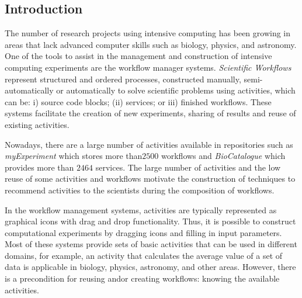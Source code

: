 \documentclass[ a0, portrait]{a0poster}
\begin{document}
\begin{multicols}{2} %


\color{Navy} %

\section*{Introduction}

The number of research projects using intensive computing has been growing in areas that lack advanced computer skills such as biology, physics, and astronomy. One of the tools to assist in the management and construction of intensive computing experiments are the workflow manager systems. \emph{Scientific Workflows} represent structured and ordered processes, constructed manually, semi-automatically or automatically to solve scientific problems using activities, which can be: i) source code blocks; (ii) services; or iii) finished workflows. These systems facilitate the creation of new experiments, sharing of results and reuse of existing activities.

Nowadays, there are a large number of activities available in repositories such as \emph{myExperiment} which stores more than$ 2500$ workflows and \emph{BioCatalogue} which provides more than $2464$ services. The large number of activities and the low reuse of some activities and workflows motivate the construction of techniques to recommend activities to the scientists during the composition of workflows.

In the workflow management systems, activities are typically represented as graphical icons with drag and drop functionality. Thus, it is possible to construct computational experiments by dragging icons and filling in input parameters. Most of these systems provide sets of basic activities that can be used in different domains, for example, an activity that calculates the average value of a set of data is applicable in biology, physics, astronomy, and other areas. However, there is a precondition for reusing and\/or creating workflows: knowing the available activities.


\end{multicols}
\end{document}
